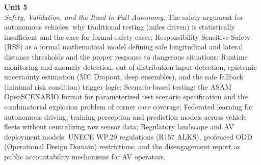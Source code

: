\vspace{0.3cm}

\noindent\textbf{Unit 5} \\
\textit{Safety, Validation, and the Road to Full Autonomy:} The safety argument for autonomous vehicles: why traditional testing (miles driven) is statistically insufficient and the case for formal safety cases; Responsibility Sensitive Safety (RSS) as a formal mathematical model defining safe longitudinal and lateral distance thresholds and the proper response to dangerous situations; Runtime monitoring and anomaly detection: out-of-distribution input detection, epistemic uncertainty estimation (MC Dropout, deep ensembles), and the safe fallback (minimal risk condition) trigger logic; Scenario-based testing: the ASAM OpenSCENARIO format for parameterized test scenario specification and the combinatorial explosion problem of corner case coverage; Federated learning for autonomous driving: training perception and prediction models across vehicle fleets without centralizing raw sensor data; Regulatory landscape and AV deployment models: UNECE WP.29 regulations (R157 ALKS), geofenced ODD (Operational Design Domain) restrictions, and the disengagement report as public accountability mechanisms for AV operators.

\newpage
{}